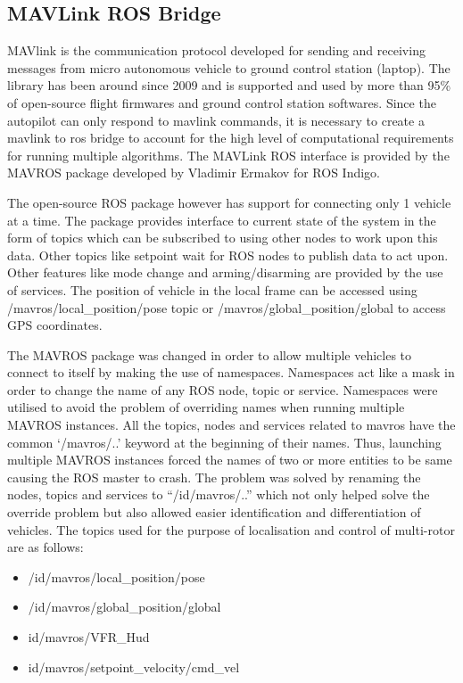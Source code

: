 \begin{spacing}{2}
\subsection{MAVLink ROS Bridge}
MAVlink is the communication protocol developed for sending and receiving
messages from micro autonomous vehicle to ground control station (laptop). The
library has been around since 2009 and is supported and used by more than 95\% of
open-source flight firmwares and ground control station softwares. Since the autopilot
can only respond to mavlink commands, it is necessary to create a mavlink to ros
bridge to account for the high level of computational requirements for running
multiple algorithms.
The MAVLink ROS interface is provided by the MAVROS package developed by
Vladimir Ermakov for ROS Indigo.\cite{mavros}

The open-source ROS package however has
support for connecting only 1 vehicle at a time. The package provides interface to
current state of the system in the form of topics which can be subscribed to using
other nodes to work upon this data. Other topics like setpoint wait for ROS nodes to
publish data to act upon. Other features like mode change and arming/disarming are
provided by the use of services. The position of vehicle in the local frame can be
accessed using /mavros/local\_position/pose topic or /mavros/global\_position/global to
access GPS coordinates.

The MAVROS package was changed in order to allow multiple vehicles to connect
to itself by making the use of namespaces. Namespaces act like a mask in order to
change the name of any ROS node, topic or service. Namespaces were utilised to
avoid the problem of overriding names when running multiple MAVROS instances.
All the topics, nodes and services related to mavros have the common ‘/mavros/..’
keyword at the beginning of their names. Thus, launching multiple MAVROS
instances forced the names of two or more entities to be same causing the ROS master
to crash. The problem was solved by renaming the nodes, topics and services to
“/id/mavros/..” which not only helped solve the override problem but also allowed
easier identification and differentiation of vehicles.
The topics used for the purpose of localisation and control of multi-rotor are as
follows:
\begin{itemize}
    \item /id/mavros/local\_position/pose
    \item /id/mavros/global\_position/global
    \item id/mavros/VFR\_Hud
    \item id/mavros/setpoint\_velocity/cmd\_vel
\end{itemize}


\end{spacing}
